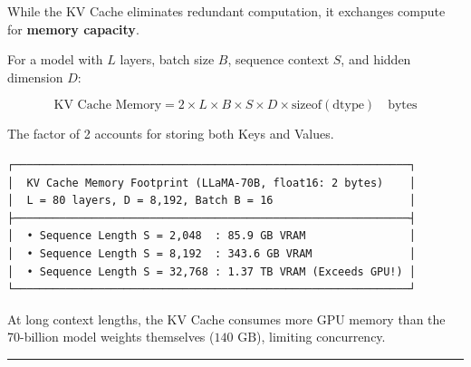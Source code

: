 \documentclass[
  letterpaper,
]{scrbook}
\begin{document}
While the KV Cache eliminates redundant computation, it exchanges
compute for \textbf{memory capacity}.

For a model with \(L\) layers, batch size \(B\), sequence context \(S\),
and hidden dimension \(D\):

\[\text{KV Cache Memory} = 2 \times L \times B \times S \times D \times \text{sizeof}(\text{dtype}) \quad \text{bytes}\]

The factor of 2 accounts for storing both Keys and Values.

\begin{verbatim}
┌─────────────────────────────────────────────────────────────┐
│  KV Cache Memory Footprint (LLaMA-70B, float16: 2 bytes)    │
│  L = 80 layers, D = 8,192, Batch B = 16                     │
├─────────────────────────────────────────────────────────────┤
│  • Sequence Length S = 2,048  : 85.9 GB VRAM                │
│  • Sequence Length S = 8,192  : 343.6 GB VRAM               │
│  • Sequence Length S = 32,768 : 1.37 TB VRAM (Exceeds GPU!) │
└─────────────────────────────────────────────────────────────┘
\end{verbatim}

At long context lengths, the KV Cache consumes more GPU memory than the
70-billion model weights themselves (\(140\text{ GB}\)), limiting
concurrency.

\begin{center}\rule{0.5\linewidth}{0.5pt}\end{center}
\end{document}
